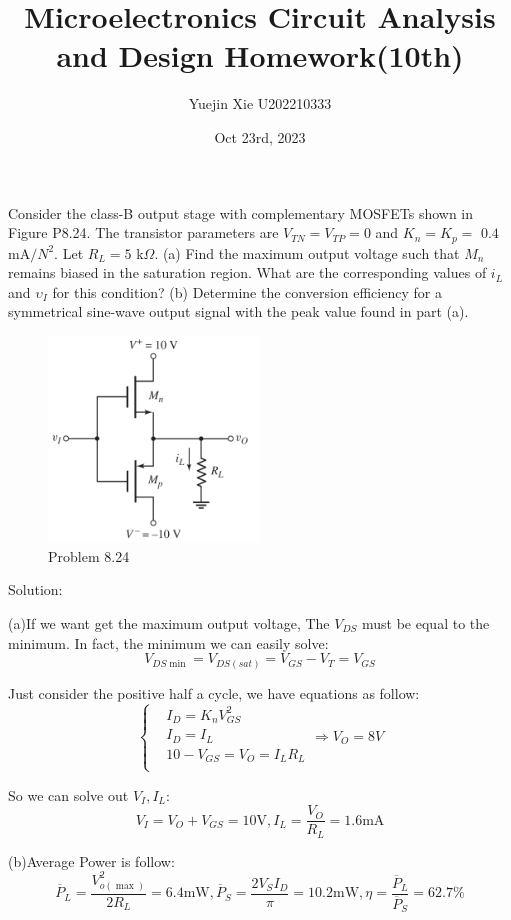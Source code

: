 \documentclass[a4paper,11pt,UTF8]{article}
\title{Microelectronics Circuit Analysis and Design Homework(10th)}
\author{Yuejin Xie \quad U202210333}
\date{Oct 23rd, 2023}
\begin{document}
 Consider the class-B output stage with complementary MOSFETs shown in Figure P8.24. The transistor parameters are $V_{TN}=V_{TP}=0$ and $K_n=K_p=$ $0.4$mA$/N^2$. Let $R_L=5$ k$\Omega$. (a) Find the maximum output voltage such that $M_n$ remains biased in the saturation region. What are the corresponding values of $i_L$ and $\upsilon_I$ for this condition? (b) Determine the conversion efficiency for a symmetrical sine-wave output signal with the peak value found in part (a).
\begin{figure}[H]
	\centering
	\includegraphics[width=0.5\textwidth]{8.24}
	\caption{Problem 8.24}
\end{figure}
\noindent Solution:

(a)If we want get the maximum output voltage, The $V_{DS}$ must be equal to the minimum. In fact, the minimum we can easily solve:
$$
	V_{DS{\min}}=V_{DS(sat)}=V_{GS}-V_T=V_{GS}
$$

Just consider the positive half a cycle, we have equations as follow:
$$\left\{
\begin{aligned}
	&I_D=K_nV_{GS}^2\\
	&I_D=I_L\\
	&10-V_{GS}=V_O=I_LR_L\\
\end{aligned}
\right.\Rightarrow V_O=8V
$$

So we can solve out $V_I, I_L$: 
$$
	V_I=V_O+V_{GS}=10\mathrm{V},I_L=\frac{V_O}{R_L}=1.6\mathrm{mA}
$$

(b)Average Power is follow:
$$
	\overline{P}_L=\frac{V_{o(\max)}^2}{2R_L}=6.4\mathrm{mW},\overline{P}_S=\frac{2V_SI_D}{\pi}=10.2\mathrm{mW},\eta=\frac{\overline{P}_L}{\overline{P}_S}=62.7\%
$$
\end{document}
